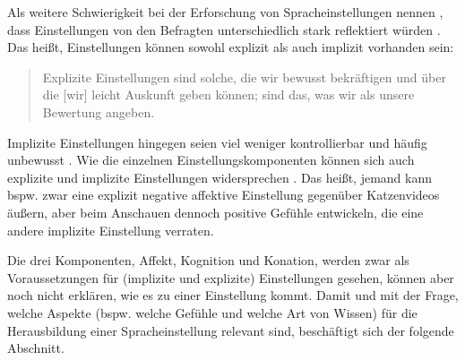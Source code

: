 Als weitere Schwierigkeit bei der Erforschung von Spracheinstellungen nennen \citet[182]{Plewnia.2011}, dass Einstellungen von den Befragten unterschiedlich stark reflektiert w{\"u}rden \citep[s. auch][143]{Riehl.2000}. 
Das heißt, Einstellungen können sowohl explizit als auch implizit vorhanden sein: 
\begin{quote}Explizite Einstellungen sind solche, die wir bewusst bekr{\"a}ftigen und {\"u}ber die [wir] leicht Auskunft geben k{\"o}nnen; sind das, was wir als unsere Bewertung angeben.~\citep[222]{Aronson.2014}\end{quote}
Implizite Einstellungen hingegen seien viel weniger kontrollierbar und häufig unbewusst \citep[s.][222]{Aronson.2014}. Wie die einzelnen Einstellungskomponenten können sich auch explizite und implizite Einstellungen widersprechen \citep[s.][222]{Aronson.2014}. Das heißt, jemand kann bspw. zwar eine explizit negative affektive Einstellung gegenüber Katzenvideos äußern, aber beim Anschauen dennoch positive Gefühle entwickeln, die eine andere implizite Einstellung verraten.

Die drei Komponenten, Affekt, Kognition und Konation, werden zwar als Voraussetzungen für (implizite und explizite) Einstellungen gesehen, können aber noch nicht erklären, wie es zu einer Einstellung kommt. 
Damit und mit der Frage, welche Aspekte (bspw. welche Gefühle und welche Art von Wissen) für die Herausbildung einer Spracheinstellung relevant sind, beschäftigt sich der folgende Abschnitt. 
